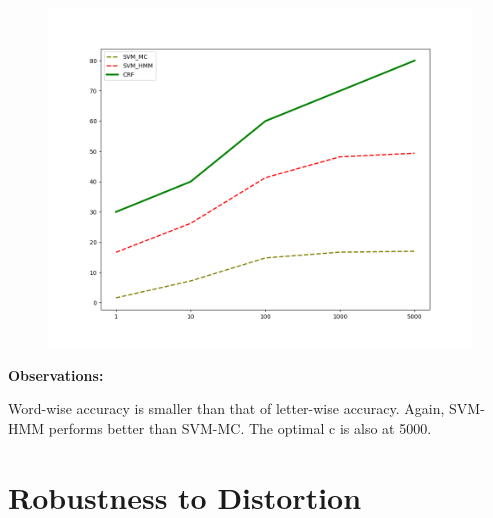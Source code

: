 \documentclass[11pt]{report}
\begin{document}
\begin{itemize}
	\begin{figure}[h]
	\includegraphics[width = 10 cm]{./wordaccuracies.png}
	\centering
	\end{figure}

	{\bf{Observations:}} 

	Word-wise accuracy is smaller than that of letter-wise accuracy. Again, SVM-HMM performs better than SVM-MC. The optimal c is also at 5000. 

\end{itemize}


\section{Robustness to Distortion}
\end{document}
